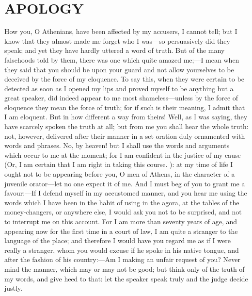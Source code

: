 \documentclass[11pt,letter]{article}
\begin{document}
\section{APOLOGY}
\par  How you, O Athenians, have been affected by my accusers, I cannot tell; but I know that they almost made me forget who I was—so persuasively did they speak; and yet they have hardly uttered a word of truth. But of the many falsehoods told by them, there was one which quite amazed me;—I mean when they said that you should be upon your guard and not allow yourselves to be deceived by the force of my eloquence. To say this, when they were certain to be detected as soon as I opened my lips and proved myself to be anything but a great speaker, did indeed appear to me most shameless—unless by the force of eloquence they mean the force of truth; for if such is their meaning, I admit that I am eloquent. But in how different a way from theirs! Well, as I was saying, they have scarcely spoken the truth at all; but from me you shall hear the whole truth: not, however, delivered after their manner in a set oration duly ornamented with words and phrases. No, by heaven! but I shall use the words and arguments which occur to me at the moment; for I am confident in the justice of my cause (Or, I am certain that I am right in taking this course. ): at my time of life I ought not to be appearing before you, O men of Athens, in the character of a juvenile orator—let no one expect it of me. And I must beg of you to grant me a favour:—If I defend myself in my accustomed manner, and you hear me using the words which I have been in the habit of using in the agora, at the tables of the money-changers, or anywhere else, I would ask you not to be surprised, and not to interrupt me on this account. For I am more than seventy years of age, and appearing now for the first time in a court of law, I am quite a stranger to the language of the place; and therefore I would have you regard me as if I were really a stranger, whom you would excuse if he spoke in his native tongue, and after the fashion of his country:—Am I making an unfair request of you? Never mind the manner, which may or may not be good; but think only of the truth of my words, and give heed to that: let the speaker speak truly and the judge decide justly.
\end{document}

